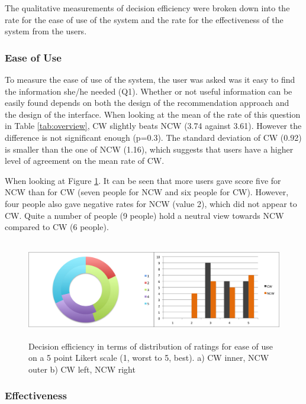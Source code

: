 The qualitative measurements of decision efficiency were broken down into the rate for the ease of use of the system and the rate for the effectiveness of the system from the users.

\subsubsection{Ease of Use} \label{sec:results_de_eu}

To measure the ease of use of the system, the user was asked was it easy to find the information she/he needed (Q1). Whether or not useful information can be easily found depends on both the design of the recommendation approach and the design of the interface. When looking at the mean of the rate of this question in Table \ref{tab:overview}, CW slightly beats NCW (3.74 against 3.61). However the difference is not significant enough (p=0.3). The standard deviation of CW (0.92) is smaller than the one of NCW (1.16), which suggests that users have a higher level of agreement on the mean rate of CW.

When looking at Figure \ref{fig:easeOfUse}. It can be seen that more users gave score five for NCW than for CW (seven people for NCW and six people for CW). However, four people also gave negative rates for NCW (value 2), which did not appear to CW. Quite a number of people (9 people) hold a neutral view towards NCW compared to CW (6 people).

\begin{figure}[H]
	\centering
	\includegraphics[height=1.7in]{figures/easeOfUse.png}
	\caption{Decision efficiency in terms of distribution of ratings for ease of use on a 5 point Likert scale (1, worst to 5, best). a) CW inner, NCW outer b) CW left, NCW right}
	\label{fig:easeOfUse}
\end{figure}

\subsubsection{Effectiveness} \label{sec:results_de_e}


